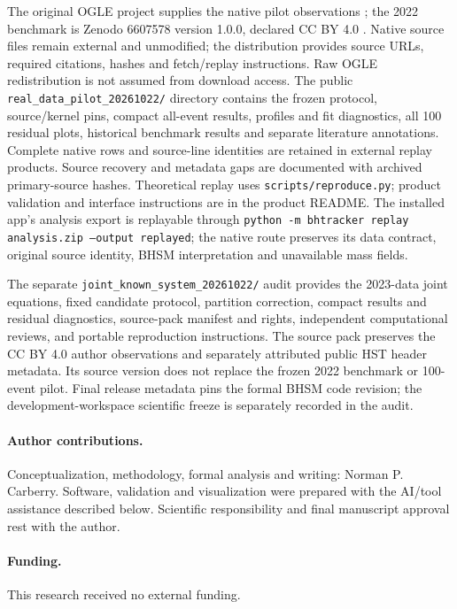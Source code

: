 \documentclass[11pt,a4paper]{article}
\begin{document}
The original OGLE project supplies the native pilot observations
\cite{Wyrzykowski2015}; the 2022 benchmark is Zenodo 6607578 version
1.0.0, declared CC BY 4.0 \cite{Lam2022Data}. Native source files remain
external and unmodified; the distribution provides source URLs, required
citations, hashes and fetch/replay instructions. Raw OGLE redistribution
is not assumed from download access. The public
\texttt{real\_data\_pilot\_20261022/} directory contains the frozen protocol,
source/kernel pins, compact all-event results, profiles and fit
diagnostics, all 100 residual plots, historical benchmark results and
separate literature annotations. Complete native rows and source-line
identities are retained in external replay products. Source recovery and
metadata gaps are documented with archived primary-source hashes.
Theoretical replay uses \texttt{scripts/reproduce.py}; product validation
and interface instructions are in the product README. The installed
app's analysis export is replayable through
\texttt{python -m bhtracker replay analysis.zip --output replayed};
the native route preserves its data contract, original source identity,
BHSM interpretation and unavailable mass fields.

The separate \texttt{joint\_known\_system\_20261022/} audit provides the
2023-data joint equations, fixed candidate protocol, partition correction,
compact results and residual diagnostics, source-pack manifest and rights,
independent computational reviews, and portable reproduction instructions.
The source pack preserves the CC BY 4.0 author observations
\cite{Mroz2022Data,LamLu2023} and separately attributed public HST header
metadata. Its source version does not replace the frozen 2022 benchmark or
100-event pilot. Final release metadata pins the formal BHSM code revision;
the development-workspace scientific freeze is separately recorded in the audit.

\paragraph{Author contributions.}
Conceptualization, methodology, formal analysis and writing:
Norman P. Carberry. Software, validation and visualization were prepared
with the AI/tool assistance described below. Scientific responsibility
and final manuscript approval rest with the author.

\paragraph{Funding.}
This research received no external funding.
\end{document}
